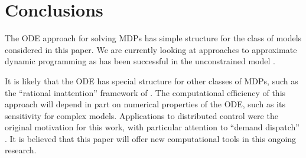 \documentclass[final,12pt]{colt2018} %
\begin{document}
\section{Conclusions} 
\label{s:conc}


The ODE approach for solving MDPs has  simple structure for the class of models considered in this paper.  We are currently looking at approaches to approximate dynamic programming as has been successful in the unconstrained model  \cite{tod09}.


It is likely that the ODE has special structure for other classes of MDPs, such as the  ``rational inattention'' framework of \cite{sim06,sharagmey16}.  The computational efficiency of this approach  will depend in part on numerical properties of the ODE, such as its sensitivity for complex models.   Applications to distributed control were the original motivation for this work, with particular attention to ``demand dispatch'' \cite{chehasmatbusmey17}.  It is believed that this paper will offer  new computational tools in this ongoing research.

 


 




 
\end{document}
